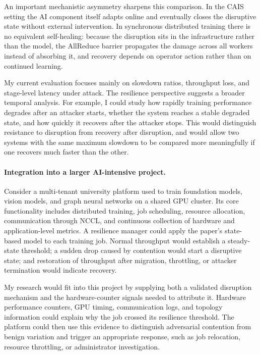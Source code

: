 \documentclass{article}
\begin{document}
An important mechanistic asymmetry sharpens this comparison. In the CAIS
setting the AI component itself adapts online and eventually closes the
disruptive state without external intervention. In synchronous distributed
training there is no equivalent self-healing: because the disruption sits in
the infrastructure rather than the model, the AllReduce barrier propagates
the damage across all workers instead of absorbing it, and recovery depends on
operator action rather than on continued learning.

My current evaluation focuses mainly on slowdown ratios, throughput loss, and
stage-level latency under attack. The resilience perspective suggests a
broader temporal analysis. For example, I could study how rapidly training
performance degrades after an attacker starts, whether the system reaches a
stable degraded state, and how quickly it recovers after the attacker stops.
This would distinguish resistance to disruption from recovery after disruption,
and would allow two systems with the same maximum slowdown to be compared
more meaningfully if one recovers much faster than the other.

\paragraph{Integration into a larger AI-intensive project.}

Consider a multi-tenant university platform used to train foundation models,
vision models, and graph neural networks on a shared GPU cluster. Its core
functionality includes distributed training, job scheduling, resource
allocation, communication through NCCL, and continuous collection of hardware
and application-level metrics. A resilience manager could apply the paper's
state-based model to each training job. Normal throughput would establish a
steady-state threshold; a sudden drop caused by contention would start a
disruptive state; and restoration of throughput after migration, throttling, or
attacker termination would indicate recovery.

My research would fit into this project by supplying both a validated
disruption mechanism and the hardware-counter signals needed to attribute it.
Hardware performance counters, GPU timing, communication logs, and topology
information could explain why the job crossed its resilience threshold. The
platform could then use this evidence to distinguish adversarial contention
from benign variation and trigger an appropriate response, such as job
relocation, resource throttling, or administrator investigation.
\end{document}
